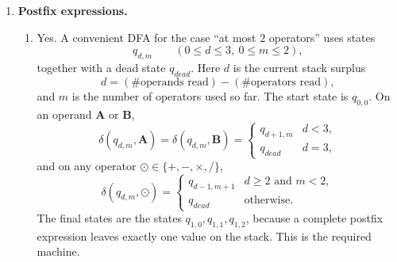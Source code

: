 \documentclass[11pt,openany]{book}
\begin{document}
\begin{enumerate}[{1.}1.]
\begin{enumerate}
\item For ``zero or more valid unnested Pascal comments,'' use
\[
B=\langle\Sigma,T,O_0,\delta,F'\rangle,
\]
where
\[
T=\{O_0,O_{(},O_{*},I_0,I_{*},D\},
\qquad
F'=\{O_0,O_{(},O_{*}\}.
\]
Here $O$ means ``outside any comment.'' The full transition function is:
\[
\begin{array}{c|ccccc}
      & \pmb{a} & \pmb{b} & \pmb{(} & \pmb{*} & \pmb{)} \\\hline
O_0   & O_0 & O_0 & O_{(} & O_{*} & O_0 \\
O_{(} & O_0 & O_0 & O_{(} & I_0   & O_0 \\
O_{*} & O_0 & O_0 & O_{(} & O_{*} & D   \\
I_0   & I_0 & I_0 & I_0   & I_{*} & I_0 \\
I_{*} & I_0 & I_0 & I_0   & I_{*} & O_0 \\
D     & D   & D   & D     & D     & D
\end{array}
\]
This machine accepts exactly the strings that end outside a comment and never
produce an illegal delimiter fragment.
\end{enumerate}

\item \textbf{Postfix expressions.}

\begin{enumerate}
\item Yes. A convenient DFA for the case ``at most $2$ operators'' uses states
\[
q_{d,m}\qquad (0\leq d\leq 3,\ 0\leq m\leq 2),
\]
together with a dead state $q_{dead}$. Here $d$ is the current stack surplus
\[
d=(\#\text{operands read})-(\#\text{operators read}),
\]
and $m$ is the number of operators used so far. The start state is $q_{0,0}$. On an operand $\pmb{A}$ or $\pmb{B}$,
\[
\delta(q_{d,m},\pmb{A})=\delta(q_{d,m},\pmb{B})=
\begin{cases}
q_{d+1,m} & d<3,\\
q_{dead} & d=3,
\end{cases}
\]
and on any operator $\odot\in\{\pmb{+},\pmb{-},\pmb{\times},\pmb{/}\}$,
\[
\delta(q_{d,m},\odot)=
\begin{cases}
q_{d-1,m+1} & d\geq 2 \text{ and } m<2,\\
q_{dead} & \text{otherwise.}
\end{cases}
\]
The final states are the states $q_{1,0},q_{1,1},q_{1,2}$, because a complete postfix expression leaves exactly one value on the stack. This is the required machine.


\end{enumerate}
\end{enumerate}
\end{document}

